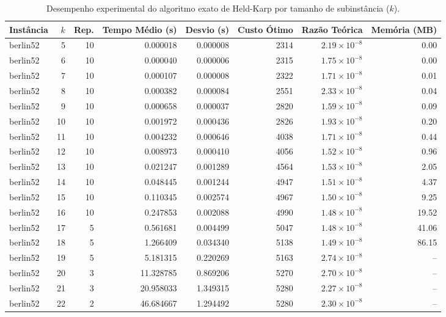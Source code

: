 \begin{table}[htbp]
\centering
\small
\caption{Desempenho experimental do algoritmo exato de Held-Karp por tamanho de subinstância ($k$).}
\label{tab:tempo_hk}
\begin{tabular}{lrrrrrrr}
\toprule
Instância & $k$ & Rep. & Tempo Médio (s) & Desvio (s) & Custo Ótimo & Razão Teórica & Memória (MB) \\
\midrule
berlin52 & 5 & 10 & 0.000018 & 0.000008 & 2314 & $2.19\times 10^{-8}$ & 0.00 \\
berlin52 & 6 & 10 & 0.000040 & 0.000006 & 2315 & $1.75\times 10^{-8}$ & 0.00 \\
berlin52 & 7 & 10 & 0.000107 & 0.000008 & 2322 & $1.71\times 10^{-8}$ & 0.01 \\
berlin52 & 8 & 10 & 0.000382 & 0.000084 & 2551 & $2.33\times 10^{-8}$ & 0.04 \\
berlin52 & 9 & 10 & 0.000658 & 0.000037 & 2820 & $1.59\times 10^{-8}$ & 0.09 \\
berlin52 & 10 & 10 & 0.001972 & 0.000436 & 2826 & $1.93\times 10^{-8}$ & 0.20 \\
berlin52 & 11 & 10 & 0.004232 & 0.000646 & 4038 & $1.71\times 10^{-8}$ & 0.44 \\
berlin52 & 12 & 10 & 0.008973 & 0.000410 & 4056 & $1.52\times 10^{-8}$ & 0.96 \\
berlin52 & 13 & 10 & 0.021247 & 0.001289 & 4564 & $1.53\times 10^{-8}$ & 2.05 \\
berlin52 & 14 & 10 & 0.048445 & 0.001244 & 4947 & $1.51\times 10^{-8}$ & 4.37 \\
berlin52 & 15 & 10 & 0.110345 & 0.002574 & 4967 & $1.50\times 10^{-8}$ & 9.25 \\
berlin52 & 16 & 10 & 0.247853 & 0.002088 & 4990 & $1.48\times 10^{-8}$ & 19.52 \\
berlin52 & 17 & 5 & 0.561681 & 0.004499 & 5047 & $1.48\times 10^{-8}$ & 41.06 \\
berlin52 & 18 & 5 & 1.266409 & 0.034340 & 5138 & $1.49\times 10^{-8}$ & 86.15 \\
berlin52 & 19 & 5 & 5.181315 & 0.220269 & 5163 & $2.74\times 10^{-8}$ & -- \\
berlin52 & 20 & 3 & 11.328785 & 0.869206 & 5270 & $2.70\times 10^{-8}$ & -- \\
berlin52 & 21 & 3 & 20.958033 & 1.349315 & 5280 & $2.27\times 10^{-8}$ & -- \\
berlin52 & 22 & 2 & 46.684667 & 1.294492 & 5280 & $2.30\times 10^{-8}$ & -- \\

\end{tabular}
\end{table}
